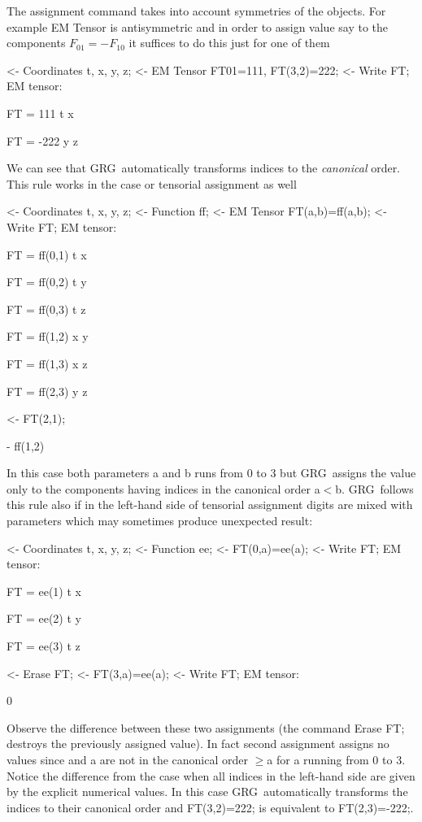 \documentclass[twoside,openright]{report}
\newcommand{\grgtt}{\ttfamily}
\renewcommand{\tt}{\grgtt}
\newcommand{\grg}{{\sc GRG}}
\newcommand{\comm}[1]{{\upshape\tt#1}}    %
\begin{document}
The assignment command takes into account symmetries of the
objects. For example {\tt EM Tensor} is antisymmetric
and in order to assign value say to the components $F_{01}=-F_{10}$
it suffices to do this just for one of them
\begin{slisting}
<- Coordinates t, x, y, z;
<- EM Tensor FT01=111, FT(3,2)=222;
<- Write FT;
EM tensor:

FT     = 111
   t x

FT     = -222
   y z
\end{slisting}
We can see that \grg\ automatically transforms indices to the
\emph{canonical} order. This rule works in the case or
tensorial assignment as well
\begin{slisting}
<- Coordinates t, x, y, z;
<- Function ff;
<- EM Tensor FT(a,b)=ff(a,b);
<- Write FT;
EM tensor:

FT     = ff(0,1)
   t x

FT     = ff(0,2)
   t y

FT     = ff(0,3)
   t z

FT     = ff(1,2)
   x y

FT     = ff(1,3)
   x z

FT     = ff(2,3)
   y z

<- FT(2,1);

 - ff(1,2)
\end{slisting}
In this case both parameters \comm{a} and \comm{b} runs from 0 to 3
but \grg\ assigns the value only to the components
having indices in the canonical order \comm{a}$<$\comm{b}.
\grg\ follows this rule also if in the left-hand
side of tensorial assignment digits are mixed with
parameters which may sometimes produce unexpected result:
\begin{slisting}
<- Coordinates t, x, y, z;
<- Function ee;
<- FT(0,a)=ee(a);
<- Write FT;
EM tensor:

FT     = ee(1)
   t x

FT     = ee(2)
   t y

FT     = ee(3)
   t z

<- Erase FT;
<- FT(3,a)=ee(a);
<- Write FT;
EM tensor:

0
\end{slisting}
Observe the difference between these two assignments (the command
\comm{Erase FT;} destroys the previously assigned value).
In fact second assignment assigns no values since
\comm{3} and \comm{a} are not in the canonical order
\comm{3}$\geq$\comm{a} for \comm{a} running from 0 to 3.
Notice the difference from the case when all indices in
the left-hand side are given by the explicit numerical values.
In this case \grg\ automatically transforms the indices to their
canonical order and \comm{FT(3,2)=222;} is equivalent
to \comm{FT(2,3)=-222;}.
\end{document}
